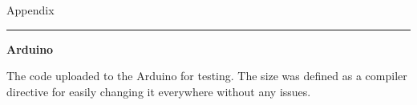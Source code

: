 \newpage
{\large Appendix}
\hrule
\label{appendix}

\textbf{Arduino}
\label{appendix:arduino}

The code uploaded to the Arduino for testing. The size was defined as 
a compiler directive for easily changing it everywhere without any issues.



